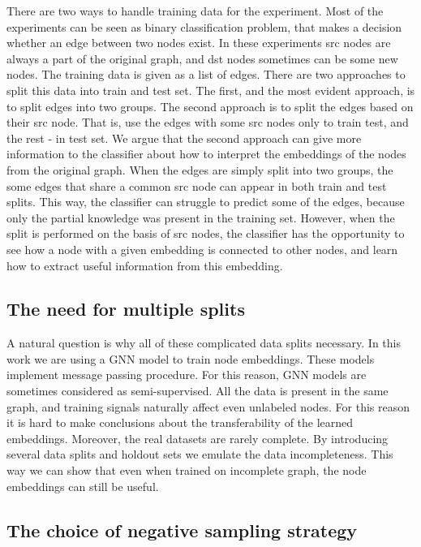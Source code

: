 \documentclass[a4paper,twoside]{article}
\begin{document}
There are two ways to handle training data for the experiment. Most of the experiments can be seen as binary classification problem, that makes a decision whether an edge between two nodes exist. In these experiments src nodes are always a part of the original graph, and dst nodes sometimes can be some new nodes. The training data is given as a list of edges. There are two approaches to split this data into train and test set. The first, and the most evident approach, is to split edges into two groups. The second approach is to split the edges based on their src node. That is, use the edges with some src nodes only to train test, and the rest - in test set. 
We argue that the second approach can give more information to the classifier about how to interpret the embeddings of the nodes from the original graph. When the edges are simply split into two groups, the some edges that share a common src node can appear in both train and test splits. This way, the classifier can struggle to predict some of the edges, because only the partial knowledge was present in the training set. However, when the split is performed on the basis of src nodes, the classifier has the opportunity to see how a node with a given embedding is connected to other nodes, and learn how to extract useful information from this embedding. 

\subsection{The need for multiple splits}

A natural question is why all of these complicated data splits necessary. In this work we are using a GNN model to train node embeddings. These models implement message passing procedure. For this reason, GNN models are sometimes considered as semi-supervised. All the data is present in the same graph, and training signals naturally affect even unlabeled nodes. For this reason it is hard to make conclusions about the transferability of the learned embeddings. Moreover, the real datasets are rarely complete. By introducing several data splits and holdout sets we emulate the data incompleteness. This way we can show that even when trained on incomplete graph, the node embeddings can still be useful.

\subsection{The choice of negative sampling strategy}
\end{document}
